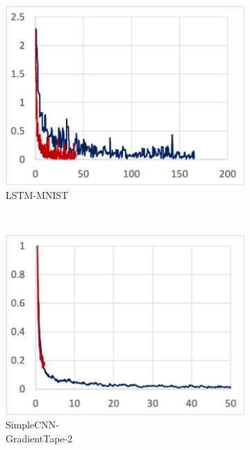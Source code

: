 \begin{figure}[!ht]
  \centering
  \begin{subfigure}[t]{.22\textwidth}
    \includegraphics[width=\textwidth]{tape-lstm}
    \caption{\footnotesize LSTM-MNIST}
  \end{subfigure}
  ~ 
  \begin{subfigure}[t]{.22\textwidth}
    \includegraphics[width=\textwidth]{tape-simple2}
    \caption{\footnotesize SimpleCNN-\\GradientTape-2}
  \end{subfigure}
  ~
  \begin{subfigure}[t]{.22\textwidth}

\end{subfigure}
\end{figure}

